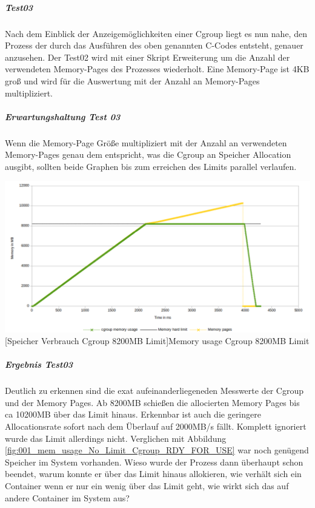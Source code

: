 \subparagraph{Test03}
Nach dem Einblick der Anzeigemöglichkeiten einer Cgroup liegt es nun nahe, den Prozess der durch das Ausführen des oben genannten C-Codes entsteht, genauer anzusehen. Der Test02 wird mit einer Skript Erweiterung um die Anzahl der verwendeten Memory-Pages des Prozesses wiederholt. Eine Memory-Page ist 4KB groß und wird für die Auswertung mit der Anzahl an Memory-Pages multipliziert.

\subparagraph{Erwartungshaltung Test 03}
Wenn die Memory-Page Größe multipliziert mit der Anzahl an verwendeten Memory-Pages genau dem entspricht, was die Cgroup an Speicher Allocation ausgibt, sollten beide Graphen bis zum erreichen des Limits parallel verlaufen.

\vspace{1em}
\begin{minipage}{\linewidth}
	\centering
	\includegraphics[width=1\linewidth]{pics/003_mem_usage_8200mb_limit_Cgroup_Pages_RDY_FOR_USE.png}
	[Speicher Verbrauch Cgroup 8200MB Limit]{Memory usage Cgroup 8200MB Limit}
	\label{fig:003_mem_usage_8200mb_limit_Cgroup_Pages_RDY_FOR_USE}
\end{minipage}

\subparagraph{Ergebnis Test03}
Deutlich zu erkennen sind die exat aufeinanderliegeneden Messwerte der Cgroup und der Memory Pages. Ab 8200MB schießen die allocierten Memory Pages bis ca 10200MB über das Limit hinaus. Erkennbar ist auch die geringere Allocationsrate sofort nach dem Überlauf auf 2000MB/s fällt. Komplett ignoriert wurde das Limit allerdings nicht. Verglichen mit Abbildung \ref{fig:001_mem_usage_No_Limit_Cgroup_RDY_FOR_USE} war noch genügend Speicher im System vorhanden. Wieso wurde der Prozess dann überhaupt schon beendet, warum konnte er über das Limit hinaus allokieren, wie verhält sich ein Container wenn er nur ein wenig über das Limit geht, wie wirkt sich das auf andere Container im System aus?

